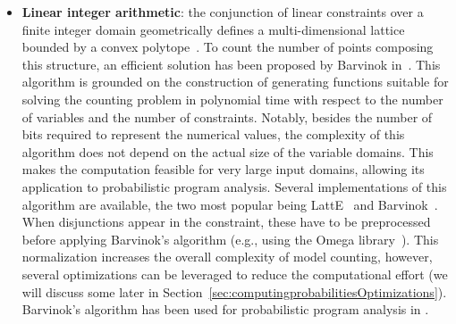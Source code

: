 \begin{itemize}
	\item \textbf{Linear integer arithmetic}: the conjunction of linear constraints over a finite integer domain geometrically defines a multi-dimensional lattice bounded by a convex polytope~\cite{de2008computationalGeometry}. To count the number of points composing this structure, an efficient solution has been proposed by Barvinok in~\cite{barvinok1994polynomial}. This algorithm is grounded on the construction of generating functions suitable for solving the counting problem in polynomial time with respect to the number of variables and the number of constraints. Notably, besides the number of bits required to represent the numerical values, the complexity of this algorithm does not depend on the actual size of the variable domains. This makes the computation feasible for very large input domains, allowing its application to probabilistic program analysis. Several implementations of this algorithm are available, the two most popular being LattE~\cite{LattESoftware} and Barvinok~\cite{verdoolaegesoftware}. When disjunctions appear in the constraint, these have to be preprocessed before applying Barvinok's algorithm (e.g., using the Omega library~\cite{Omega1996}). This normalization increases the overall complexity of model counting, however, several optimizations can be leveraged to reduce the computational effort (we will discuss some later in Section~\ref{sec:computingprobabilitiesOptimizations}). Barvinok's algorithm has been used for probabilistic program analysis in \cite{Geldenhuys2012,Filieri2013,Filieri2015}.


\end{itemize}
